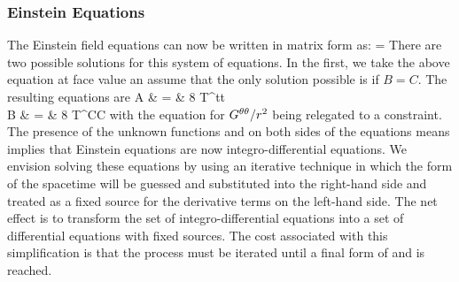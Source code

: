 \documentclass{article}
\begin{document}
\subsubsection{Einstein Equations}

The Einstein field equations can now be written in matrix form as:
\bes
=
    \eqp
\ees
There are two possible solutions for this system of equations.
In the first, we take the above equation at face value an assume that
the only solution possible is if $B = C$.
The resulting equations are
\bea
  A & = & 8 \gp T^{tt} \\
  B & = & 8 \gp T^{CC} \eqc
\eea
with the equation for $G^{\theta\theta}/r^2$ being relegated to a constraint.
The presence of the unknown functions \gF and \gm on both sides
of the equations means implies that Einstein equations are now integro-differential
equations.  We envision solving these equations by using an iterative technique in
which the form of the spacetime will be guessed and substituted into the
right-hand side and treated as a fixed source for the derivative terms on the
left-hand side.  The net effect is to transform the set of integro-differential
equations into a set of differential equations with fixed sources.  The cost
associated with this simplification is that the process must be iterated until
a final form of \gF and \gm is reached.
\end{document}
